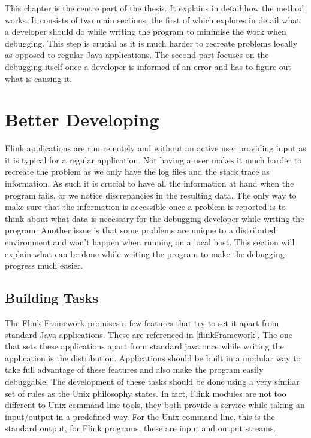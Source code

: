
This chapter is the centre part of the thesis. It explains in detail how the method works. It consists of two main sections, the first of which explores in detail what a developer should do while writing the program to minimise the work when debugging. This step is crucial as it is much harder to recreate problems locally as opposed to regular Java applications. The second part focuses on the debugging itself once a developer is informed of an error and has to figure out what is causing it.

\section{Better Developing}
Flink applications are run remotely and without an active user providing input as it is typical for a regular application. Not having a user makes it much harder to recreate the problem as we only have the log files and the stack trace as information. As such it is crucial to have all the information at hand when the program fails, or we notice discrepancies in the resulting data. The only way to make sure that the information is accessible once a problem is reported is to think about what data is necessary for the debugging developer while writing the program. Another issue is that some problems are unique to a distributed environment and won't happen when running on a local host. This section will explain what can be done while writing the program to make the debugging progress much easier.

\subsection{Building Tasks}
The Flink Framework promises a few features that try to set it apart from standard Java applications. These are referenced in \ref{flinkFramework}. The one that sets these applications apart from standard java once while writing the application is the distribution. Applications should be built in a modular way to take full advantage of these features and also make the program easily debuggable.
The development of these tasks should be done using a very similar set of rules as the Unix philosophy states. In fact, Flink modules are not too different to Unix command line tools, they both provide a service while taking an input/output in a predefined way. For the Unix command line, this is the standard output, for Flink programs, these are input and output streams.

